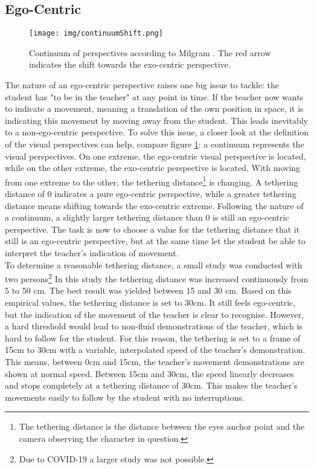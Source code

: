 \subsection{Ego-Centric}
\begin{figure}
	\centering
	\texttt{[image: img/continuumShift.png]}
	\caption{Continuum of perspectives according to Milgram \cite{Milgram1994}. The red arrow indicates the shift towards the exo-centric perspective.}
	\label{fig:continuumShift}
\end{figure}
The nature of an ego-centric perspective raises one big issue to tackle: the student has "to be in the teacher" at any point in time. If the teacher now wants to indicate a movement, meaning a translation of the own position in space, it is indicating this movement by moving away from the student. This leads inevitably to a non-ego-centric perspective. To solve this issue, a closer look at the definition of the visual perspectives can help, compare figure \ref{fig:continuumShift}: a continuum represents the visual perspectives. On one extreme, the ego-centric visual perspective is located, while on the other extreme, the exo-centric perspective is located. With moving from one extreme to the other, the tethering distance\footnote{The tethering distance is the distance between the eyes anchor point and the camera observing the character in question.} is changing. A tethering distance of 0 indicates a pure ego-centric perspective, while a greater tethering distance means shifting towards the exo-centric extreme. Following the nature of a continuum, a slightly larger tethering distance than 0 is still an ego-centric perspective. The task is now to choose a value for the tethering distance that it still is an ego-centric perspective, but at the same time let the student be able to interpret the teacher's indication of movement.\\
To determine a reasonable tethering distance, a small study was conducted with two persons\footnote{Due to COVID-19 a larger study was not possible.} In this study the tethering distance was increased continuously from 5 to 50 cm. The best result was yielded between 15 and 30 cm. Based on this empirical values, the tethering distance is set to 30cm. It still feels ego-centric, but the indication of the movement of the teacher is clear to recognise. However, a hard threshold would lead to non-fluid demonstrations of the teacher, which is hard to follow for the student. For this reason, the tethering is set to a frame of 15cm to 30cm with a variable, interpolated speed of the teacher's demonstration. This means, between 0cm and 15cm, the teacher's movement demonstrations are shown at normal speed. Between 15cm and 30cm, the speed linearly decreases and stops completely at a tethering distance of 30cm. This makes the teacher's movements easily to follow by the student with no interruptions.\\
